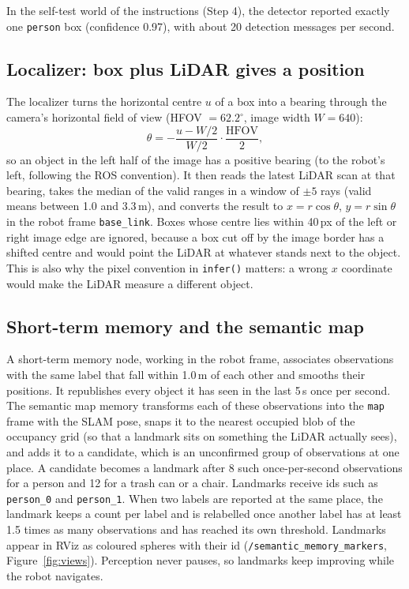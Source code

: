 \documentclass[11pt]{article}
\begin{document}
In the self-test world of the instructions (Step 4), the detector reported exactly one \texttt{person} box (confidence 0.97), with about 20 detection messages per second.

\subsection{Localizer: box plus LiDAR gives a position}

The localizer turns the horizontal centre $u$ of a box into a bearing through the camera's horizontal field of view (HFOV $=62.2^\circ$, image width $W=640$):
\[
\theta = -\frac{u - W/2}{W/2}\cdot\frac{\mathrm{HFOV}}{2},
\]
so an object in the left half of the image has a positive bearing (to the robot's left, following the ROS convention). It then reads the latest LiDAR scan at that bearing, takes the median of the valid ranges in a window of $\pm 5$ rays (valid means between 1.0 and 3.3\,m), and converts the result to $x = r\cos\theta$, $y = r\sin\theta$ in the robot frame \texttt{base\_link}. Boxes whose centre lies within 40\,px of the left or right image edge are ignored, because a box cut off by the image border has a shifted centre and would point the LiDAR at whatever stands next to the object. This is also why the pixel convention in \texttt{infer()} matters: a wrong $x$ coordinate would make the LiDAR measure a different object.

\subsection{Short-term memory and the semantic map}

A short-term memory node, working in the robot frame, associates observations with the same label that fall within 1.0\,m of each other and smooths their positions. It republishes every object it has seen in the last 5\,s once per second. The semantic map memory transforms each of these observations into the \texttt{map} frame with the SLAM pose, snaps it to the nearest occupied blob of the occupancy grid (so that a landmark sits on something the LiDAR actually sees), and adds it to a candidate, which is an unconfirmed group of observations at one place. A candidate becomes a landmark after 8 such once-per-second observations for a person and 12 for a trash can or a chair. Landmarks receive ids such as \texttt{person\_0} and \texttt{person\_1}. When two labels are reported at the same place, the landmark keeps a count per label and is relabelled once another label has at least 1.5 times as many observations and has reached its own threshold. Landmarks appear in RViz as coloured spheres with their id (\texttt{/semantic\_memory\_markers}, Figure~\ref{fig:views}). Perception never pauses, so landmarks keep improving while the robot navigates.
\end{document}
